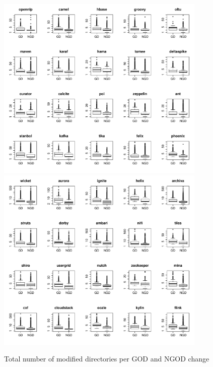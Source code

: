 \begin{figure}[tb]
	\centering
	\includegraphics[width=100mm]{figures/chapter4/rq3_god_nd_logged_1}
	\includegraphics[width=100mm]{figures/chapter4/rq3_god_nd_logged_2}
	\caption{Total number of modified directories per GOD and NGOD change}
	\label{figure:total_nd_changed_god_vs_ngod}
\end{figure}


